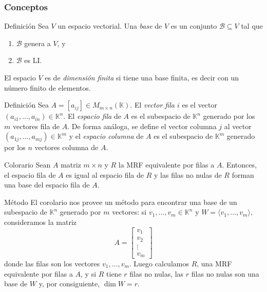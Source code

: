 \documentclass[a4paper,12pt]{article}
\begin{document}
\subsubsection{Conceptos}
\begin{defbox}{Definición}
    Sea $V$ un espacio vectorial. Una \textit{base} de $V$ es un conjunto $\mathcal{B} \subseteq V$ tal que
     \begin{enumerate}
         \item\label{it.genera} $\mathcal{B}$ genera a $V$, y
         \item\label{it.li} $\mathcal{B}$ es LI.
     \end{enumerate}
      El espacio $V$ es de \textit{dimensión finita} si tiene una base finita,  es decir con  un número finito de elementos.
\end{defbox}
\begin{defbox}{Definición}
    Sea $A = [a_{ij}] \in M_{m \times n}(\mathds{K})$. El \textit{vector fila $i$} es el vector  $(a_{i1},\ldots,a_{in}) \in \mathds{K}^n$. El \textit{espacio fila} de $A$ es el subespacio de $\mathds{K}^n$ generado por los $m$ vectores fila de $A$.  De forma análoga, se define  el vector columna $j$ al vector $(a_{1j},\ldots,a_{mj}) \in \mathds{K}^m$ y  el \textit{espacio columna} de $A$ es el subespacio de $\mathds{K}^m$ generado por los $n$ vectores columna de $A$.
\end{defbox}
\begin{teobox}{Colorario}
    Sean $A$ matriz $m \times n$ y $R$ la MRF equivalente por filas a $A$. Entonces, el espacio fila de $A$ es igual al espacio fila de $R$ y las filas no nulas de $R$ forman una base del espacio fila de $A$. 
\end{teobox}
\begin{obbox}{Método}
    El  corolario  nos provee un método para encontrar una base de un  subespacio de $\mathds{K}^n$ generado por $m$ vectores: si $v_1,\ldots,v_m \in \mathds{K}^n$ y $W = \langle v_1,\ldots,v_m\rangle$, consideramos la matriz 
    $$
    A = \begin{bmatrix}
    v_1 \\ v_2 \\ \vdots \\ v_m
    \end{bmatrix}
    $$
    donde las filas son los vectores $v_1,\ldots,v_m$. Luego calculamos $R$, una MRF equivalente por filas a $A$, y si $R$ tiene $r$ filas no nulas, las $r$ filas no nulas son una base de $W$ y, por consiguiente, $\dim W = r$. 
\end{obbox}
\end{document}
